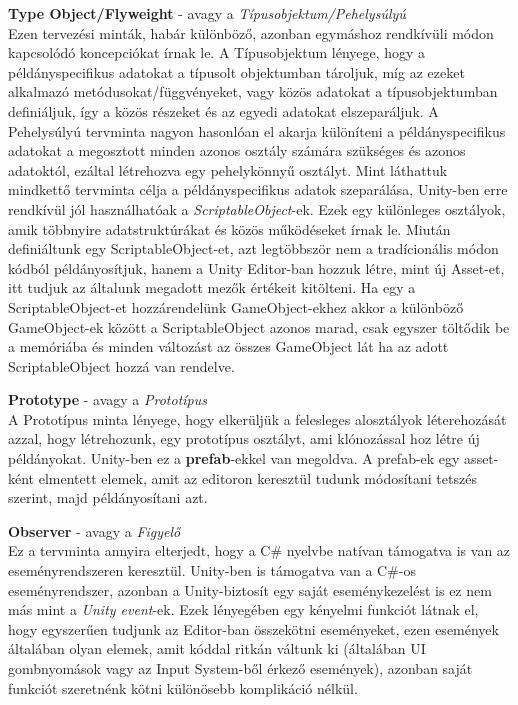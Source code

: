 \textbf{Type Object/Flyweight} - avagy a \textit{Típusobjektum/Pehelysúlyú}\\
Ezen tervezési minták, habár különböző, azonban egymáshoz rendkívüli módon kapcsolódó koncepciókat írnak le. A Típusobjektum lényege, hogy a példányspecifikus adatokat a típusolt objektumban tároljuk, míg az ezeket alkalmazó metódusokat/függvényeket, vagy közös adatokat a típusobjektumban definiáljuk, így a közös részeket és az egyedi adatokat elszeparáljuk. A Pehelysúlyú tervminta nagyon hasonlóan el akarja különíteni a példányspecifikus adatokat a megosztott minden azonos osztály számára szükséges és azonos adatoktól, ezáltal létrehozva egy pehelykönnyű osztályt. Mint láthattuk mindkettő tervminta célja a példányspecifikus adatok szeparálása, Unity-ben erre rendkívül jól használhatóak a \textit{ScriptableObject}-ek. Ezek egy különleges osztályok, amik többnyire adatstruktúrákat és közös működéseket írnak le. Miután definiáltunk egy ScriptableObject-et, azt legtöbbször nem a tradícionális módon kódból példányosítjuk, hanem a Unity Editor-ban hozzuk létre, mint új Asset-et, itt tudjuk az általunk megadott mezők értékeit kitölteni. Ha egy a ScriptableObject-et hozzárendelünk GameObject-ekhez akkor a különböző GameObject-ek között a ScriptableObject azonos marad, csak egyszer töltődik be a memóriába és minden változást az összes GameObject lát ha az adott ScriptableObject hozzá van rendelve.

\textbf{Prototype} - avagy a \textit{Prototípus}\\
A Prototípus minta lényege, hogy elkerüljük a felesleges alosztályok léterehozását azzal, hogy létrehozunk, egy prototípus osztályt, ami klónozással hoz létre új példányokat. Unity-ben ez a \textbf{prefab}-ekkel van megoldva. A prefab-ek egy asset-ként elmentett elemek, amit az editoron keresztül tudunk módosítani tetszés szerint, majd példányosítani azt. 

\textbf{Observer} - avagy a \textit{Figyelő}\\
Ez a tervminta annyira elterjedt, hogy a C\# nyelvbe natívan támogatva is van az eseményrendszeren keresztül. Unity-ben is támogatva van a C\#-os eseményrendszer, azonban a Unity-biztosít egy saját eseménykezelést is ez nem más mint a \textit{Unity event}-ek. Ezek lényegében egy kényelmi funkciót látnak el, hogy egyszerűen tudjunk az Editor-ban összekötni eseményeket, ezen események általában olyan elemek, amit kóddal ritkán váltunk ki (általában UI gombnyomások vagy az Input System-ből érkező események), azonban saját funkciót szeretnénk kötni különösebb komplikáció nélkül.

